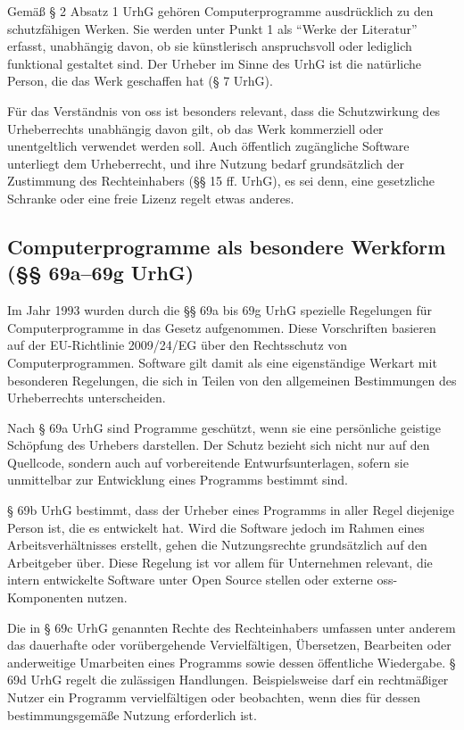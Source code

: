Gemäß § 2 Absatz 1 UrhG gehören Computerprogramme ausdrücklich zu den schutzfähigen Werken.
Sie werden unter Punkt 1 als \enquote{Werke der Literatur} erfasst, unabhängig davon, ob sie künstlerisch anspruchsvoll oder lediglich funktional gestaltet sind.
Der Urheber im Sinne des UrhG ist die natürliche Person, die das Werk geschaffen hat (§ 7 UrhG).

Für das Verständnis von \gls{oss} ist besonders relevant, dass die Schutzwirkung des Urheberrechts unabhängig davon gilt, ob das Werk kommerziell oder unentgeltlich verwendet werden soll.
Auch öffentlich zugängliche Software unterliegt dem Urheberrecht, und ihre Nutzung bedarf grundsätzlich der Zustimmung des Rechteinhabers (§§ 15 ff. UrhG), es sei denn, eine gesetzliche Schranke oder eine freie Lizenz regelt etwas anderes.


\subsection{Computerprogramme als besondere Werkform (§§ 69a–69g UrhG)}

Im Jahr 1993 wurden durch die §§ 69a bis 69g UrhG spezielle Regelungen für Computerprogramme in das Gesetz aufgenommen.
Diese Vorschriften basieren auf der EU-Richtlinie 2009/24/EG über den Rechtsschutz von Computerprogrammen.
Software gilt damit als eine eigenständige Werkart mit besonderen Regelungen, die sich in Teilen von den allgemeinen Bestimmungen des Urheberrechts unterscheiden.

Nach § 69a UrhG sind Programme geschützt, wenn sie eine persönliche geistige Schöpfung des Urhebers darstellen.
Der Schutz bezieht sich nicht nur auf den Quellcode, sondern auch auf vorbereitende Entwurfsunterlagen, sofern sie unmittelbar zur Entwicklung eines Programms bestimmt sind.

§ 69b UrhG bestimmt, dass der Urheber eines Programms in aller Regel diejenige Person ist, die es entwickelt hat.
Wird die Software jedoch im Rahmen eines Arbeitsverhältnisses erstellt, gehen die Nutzungsrechte grundsätzlich auf den Arbeitgeber über.
Diese Regelung ist vor allem für Unternehmen relevant, die intern entwickelte Software unter Open Source stellen oder externe \gls{oss}-Komponenten nutzen.

Die in § 69c UrhG genannten Rechte des Rechteinhabers umfassen unter anderem das dauerhafte oder vorübergehende Vervielfältigen, Übersetzen, Bearbeiten oder anderweitige Umarbeiten eines Programms sowie dessen öffentliche Wiedergabe.
§ 69d UrhG regelt die zulässigen Handlungen.
Beispielsweise darf ein rechtmäßiger Nutzer ein Programm vervielfältigen oder beobachten, wenn dies für dessen bestimmungsgemäße Nutzung erforderlich ist.

